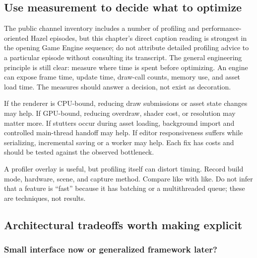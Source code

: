 \subsection{Use measurement to decide what to optimize}\label{06-engine-ii-ch041-use-measurement-to-decide-what-to-optimize}

\hypertarget{06-engine-ii-ch041-use-measurement-to-decide-what-to-optimize}{}

The public channel inventory includes a number of profiling and performance-oriented Hazel episodes, but this chapter's direct caption reading is strongest in the opening Game Engine sequence; do not attribute detailed profiling advice to a particular episode without consulting its transcript. The general engineering principle is still clear: measure where time is spent before optimizing. An engine can expose frame time, update time, draw-call counts, memory use, and asset load time. The measures should answer a decision, not exist as decoration.

If the renderer is CPU-bound, reducing draw submissions or asset state changes may help. If GPU-bound, reducing overdraw, shader cost, or resolution may matter more. If stutters occur during asset loading, background import and controlled main-thread handoff may help. If editor responsiveness suffers while serializing, incremental saving or a worker may help. Each fix has costs and should be tested against the observed bottleneck.

A profiler overlay is useful, but profiling itself can distort timing. Record build mode, hardware, scene, and capture method. Compare like with like. Do not infer that a feature is ``fast'' because it has batching or a multithreaded queue; these are techniques, not results.

\subsection{Architectural tradeoffs worth making explicit}\label{06-engine-ii-ch041-architectural-tradeoffs-worth-making-explicit}

\hypertarget{06-engine-ii-ch041-architectural-tradeoffs-worth-making-explicit}{}

\subsubsection{Small interface now or generalized framework later?}\label{06-engine-ii-ch041-small-interface-now-or-generalized-framework-later}


